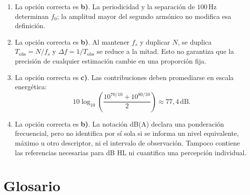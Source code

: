 \begin{enumerate}[label=\textbf{D\arabic*.},leftmargin=*]
    \item La opción correcta es \textbf{b)}. La periodicidad y la separación
    de \(100\,\text{Hz}\) determinan \(f_0\); la amplitud mayor del segundo
    armónico no modifica esa definición.

    \item La opción correcta es \textbf{b)}. Al mantener \(f_s\) y duplicar
    \(N\), se duplica \(T_\mathrm{obs}=N/f_s\) y
    \(\Delta f=1/T_\mathrm{obs}\) se reduce a la mitad. Esto no garantiza que
    la precisión de cualquier estimación cambie en una proporción fija.

    \item La opción correcta es \textbf{c)}. Las contribuciones deben
    promediarse en escala energética:
    \[
        10\log_{10}
        \left(\frac{10^{70/10}+10^{80/10}}{2}\right)
        \approx77{,}4\,\text{dB}.
    \]

    \item La opción correcta es \textbf{b)}. La notación dB(A) declara una
    ponderación frecuencial, pero no identifica por sí sola si se informa un
    nivel equivalente, máximo u otro descriptor, ni el intervalo de
    observación. Tampoco contiene las referencias necesarias para dB HL ni
    cuantifica una percepción individual.
\end{enumerate}

\section{Glosario}
\label{sec:u5-glosario}

